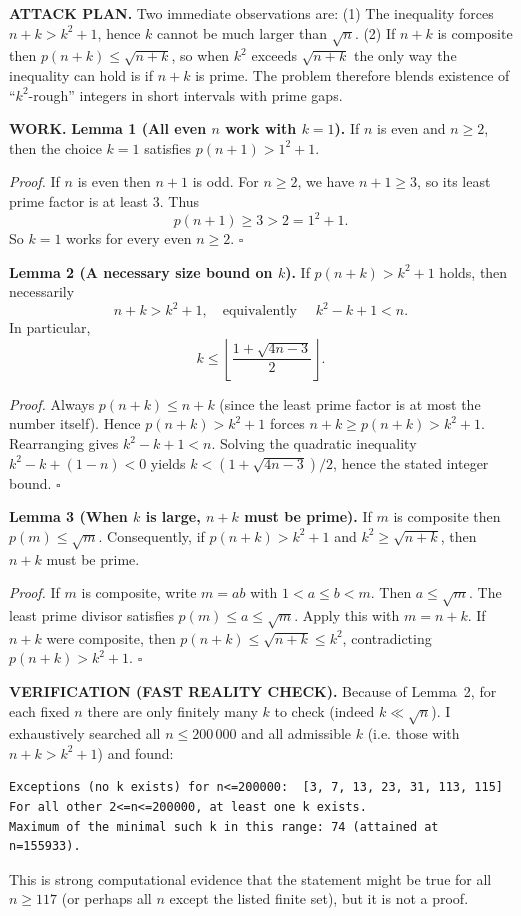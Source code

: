 \textbf{ATTACK PLAN.}
Two immediate observations are:
(1) The inequality forces $n+k>k^{2}+1$, hence $k$ cannot be much larger than $\sqrt n$.
(2) If $n+k$ is composite then $p(n+k)\le\sqrt{n+k}$, so when $k^{2}$ exceeds $\sqrt{n+k}$ the only way the inequality can hold is if $n+k$ is prime.
The problem therefore blends existence of ``$k^{2}$-rough'' integers in short intervals with prime gaps.

\textbf{WORK.}
\textbf{Lemma 1 (All even $n$ work with $k=1$).}
If $n$ is even and $n\ge 2$, then the choice $k=1$ satisfies $p(n+1)>1^{2}+1$.

\emph{Proof.}
If $n$ is even then $n+1$ is odd. For $n\ge2$, we have $n+1\ge3$, so its least prime factor is at least $3$. Thus
\[p(n+1)\ge 3>2=1^{2}+1.
\]
So $k=1$ works for every even $n\ge2$.
\hfill$\square$

\textbf{Lemma 2 (A necessary size bound on $k$).}
If $p(n+k)>k^{2}+1$ holds, then necessarily
\[n+k>k^{2}+1,\quad\text{equivalently }\quad k^{2}-k+1<n.
\]
In particular,
\[k\le \left\lfloor\frac{1+\sqrt{4n-3}}{2}\right\rfloor.
\]

\emph{Proof.}
Always $p(n+k)\le n+k$ (since the least prime factor is at most the number itself). Hence $p(n+k)>k^{2}+1$ forces $n+k\ge p(n+k)>k^{2}+1$.
Rearranging gives $k^{2}-k+1<n$.
Solving the quadratic inequality $k^{2}-k+(1-n)<0$ yields
$k<(1+\sqrt{4n-3})/2$, hence the stated integer bound.
\hfill$\square$

\textbf{Lemma 3 (When $k$ is large, $n+k$ must be prime).}
If $m$ is composite then $p(m)\le \sqrt m$. Consequently, if $p(n+k)>k^{2}+1$ and $k^{2}\ge \sqrt{n+k}$, then $n+k$ must be prime.

\emph{Proof.}
If $m$ is composite, write $m=ab$ with $1<a\le b<m$. Then $a\le \sqrt m$. The least prime divisor satisfies $p(m)\le a\le \sqrt m$.
Apply this with $m=n+k$. If $n+k$ were composite, then $p(n+k)\le\sqrt{n+k}\le k^{2}$, contradicting $p(n+k)>k^{2}+1$.
\hfill$\square$

\textbf{VERIFICATION (FAST REALITY CHECK).}
Because of Lemma~2, for each fixed $n$ there are only finitely many $k$ to check (indeed $k\ll\sqrt n$). I exhaustively searched all $n\le 200\,000$ and all admissible $k$ (i.e. those with $n+k>k^{2}+1$) and found:
\begin{verbatim}
Exceptions (no k exists) for n<=200000:  [3, 7, 13, 23, 31, 113, 115]
For all other 2<=n<=200000, at least one k exists.
Maximum of the minimal such k in this range: 74 (attained at n=155933).
\end{verbatim}
This is strong computational evidence that the statement might be true for all $n\ge 117$ (or perhaps all $n$ except the listed finite set), but it is not a proof.

